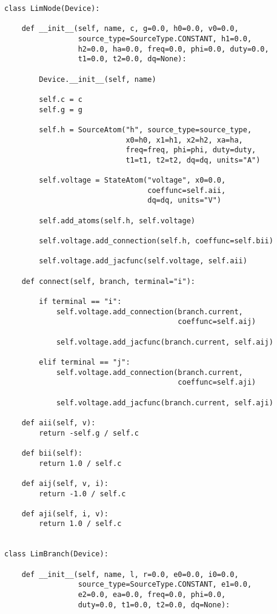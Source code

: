 \begin{lstlisting}
class LimNode(Device):

    def __init__(self, name, c, g=0.0, h0=0.0, v0=0.0,
                 source_type=SourceType.CONSTANT, h1=0.0,
                 h2=0.0, ha=0.0, freq=0.0, phi=0.0, duty=0.0,
                 t1=0.0, t2=0.0, dq=None):

        Device.__init__(self, name)

        self.c = c
        self.g = g

        self.h = SourceAtom("h", source_type=source_type,
                            x0=h0, x1=h1, x2=h2, xa=ha,
                            freq=freq, phi=phi, duty=duty,
                            t1=t1, t2=t2, dq=dq, units="A")

        self.voltage = StateAtom("voltage", x0=0.0,
                                 coeffunc=self.aii,
                                 dq=dq, units="V")

        self.add_atoms(self.h, self.voltage)
        
        self.voltage.add_connection(self.h, coeffunc=self.bii)
        
        self.voltage.add_jacfunc(self.voltage, self.aii)

    def connect(self, branch, terminal="i"):

        if terminal == "i":
            self.voltage.add_connection(branch.current, 
                                        coeffunc=self.aij)
                                        
            self.voltage.add_jacfunc(branch.current, self.aij)

        elif terminal == "j":
            self.voltage.add_connection(branch.current,  
                                        coeffunc=self.aji)
                                        
            self.voltage.add_jacfunc(branch.current, self.aji)

    def aii(self, v):
        return -self.g / self.c

    def bii(self):
        return 1.0 / self.c

    def aij(self, v, i):
        return -1.0 / self.c

    def aji(self, i, v):
        return 1.0 / self.c


class LimBranch(Device):

    def __init__(self, name, l, r=0.0, e0=0.0, i0=0.0,
                 source_type=SourceType.CONSTANT, e1=0.0,
                 e2=0.0, ea=0.0, freq=0.0, phi=0.0,
                 duty=0.0, t1=0.0, t2=0.0, dq=None):


\end{lstlisting}
